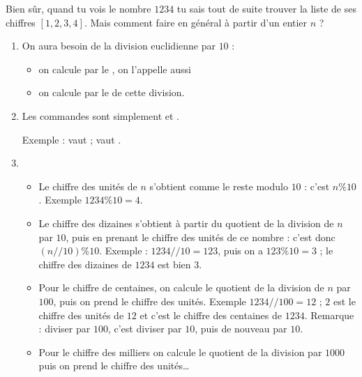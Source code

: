 \documentclass[11pt,class=report,crop=false]{standalone}
\begin{document}
\begin{cours}

Bien sûr, quand tu vois le nombre $1234$ tu sais tout de suite trouver la liste de ses  chiffres $[1,2,3,4]$. Mais comment faire en général à partir d'un entier $n$ ?
 
\begin{enumerate}
  \item On aura besoin de la division euclidienne par $10$ :
  \begin{itemize}
    \item on calcule par  le , on l'appelle aussi 
    \item on calcule par  le  de cette division. 
  \end{itemize}
  
  
  \item Les commandes \Python{} sont simplement  et .
  
  Exemple :  vaut  ;  vaut .
  
  \item
  \begin{itemize}
    \item Le chiffre des unités de $n$ s'obtient comme le reste modulo $10$ : c'est $n\%10$. Exemple $1234 \% 10 = 4$.
    \item Le chiffre des dizaines s'obtient à partir du quotient de la division de $n$ par $10$, puis en prenant le chiffre des unités de ce nombre : c'est donc $(n // 10) \% 10$.
   Exemple : $1234 // 10 = 123$, puis on a $123 \% 10 = 3$ ; le chiffre des dizaines de $1234$ est bien $3$.
   
   \item Pour le chiffre de centaines, on calcule le quotient de la division de $n$ par $100$, puis on prend le chiffre des unités.  Exemple $1234 // 100 = 12$ ; $2$ est le chiffre des unités de $12$ et c'est le chiffre des centaines de $1234$. Remarque : diviser par $100$, c'est diviser par $10$, puis de nouveau par $10$.
   
   \item Pour le chiffre des milliers on calcule le quotient de la division par $1000$ puis on prend le chiffre des unités\ldots
   \end{itemize} 
 \end{enumerate}     

\end{cours}
\end{document}
